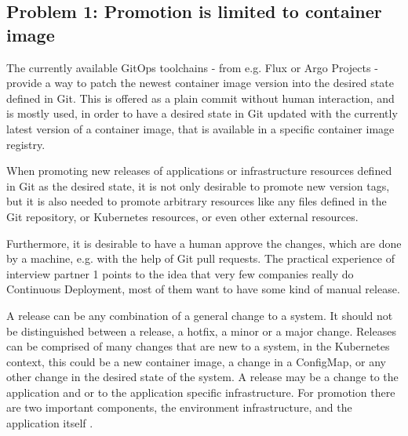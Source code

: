 \subsection{Problem 1: Promotion is limited to container image}
\label{problem1}

The currently available GitOps toolchains -
from e.g. Flux or Argo Projects -
provide a way to patch the newest container image version
into the desired state defined in Git.
This is offered as a plain commit without human interaction,
and is mostly used, in order to have a desired state in Git updated with
the currently latest version of a container image,
that is available in a specific container image registry.

When promoting new releases of applications or infrastructure resources defined in Git as the 
desired state, it is not only desirable to promote new version tags,
but it is also needed to promote arbitrary resources like any files
defined in the Git repository,
or Kubernetes resources, or even other external resources.


Furthermore, it is desirable to have a human approve the changes,
which are done by a machine, e.g. with the help of Git pull requests.
The practical experience of interview partner 1 points to the idea that
very few companies really do Continuous Deployment, most of them want to have some kind of manual release.


A release can be any combination of a general change to a system.
It should not be distinguished between a release, a hotfix, a minor or a major change.
Releases can be comprised of many changes that are new to a system,
in the Kubernetes context, this could be a new container image,
a change in a ConfigMap, or any other change in the desired state of the system.
A release may be a change to the application and or to the application specific infrastructure.
For promotion there are two important components,
the environment infrastructure, and the application itself
\autocite{gitopsAndKubernetes2021continuous}.

